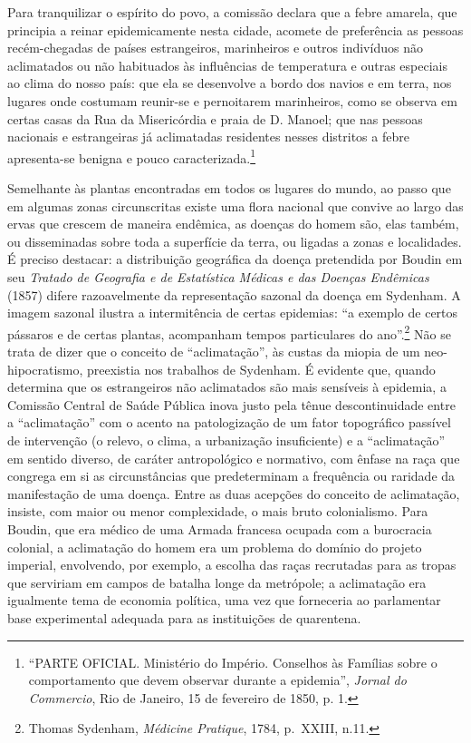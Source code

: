 Para tranquilizar o espírito do povo, a comissão declara que a febre
amarela, que principia a reinar epidemicamente nesta cidade, acomete de
preferência as pessoas recém-chegadas de países estrangeiros,
marinheiros e outros indivíduos não aclimatados ou não habituados às
influências de temperatura e outras especiais ao clima do nosso país:
que ela se desenvolve a bordo dos navios e em terra, nos lugares onde
costumam reunir-se e pernoitarem marinheiros, como se observa em certas
casas da Rua da Misericórdia e praia de D. Manoel; que nas pessoas
nacionais e estrangeiras já aclimatadas residentes nesses distritos a
febre apresenta-se benigna e pouco caracterizada.\footnote{``PARTE
  OFICIAL. Ministério do Império. Conselhos às Famílias sobre o
  comportamento que devem observar durante a epidemia'', \emph{Jornal do
  Commercio}, Rio de Janeiro, 15 de fevereiro de 1850, p. 1.}

Semelhante às plantas encontradas em todos os lugares do mundo, ao passo
que em algumas zonas circunscritas existe uma flora nacional que convive
ao largo das ervas que crescem de maneira endêmica, as doenças do homem
são, elas também, ou disseminadas sobre toda a superfície da terra, ou
ligadas a zonas e localidades. É preciso destacar: a distribuição
geográfica da doença pretendida por Boudin em seu \emph{Tratado de
Geografia e de Estatística Médicas e das Doenças Endêmicas} (1857)
difere razoavelmente da representação sazonal da doença em Sydenham. A
imagem sazonal ilustra a intermitência de certas epidemias: ``a exemplo
de certos pássaros e de certas plantas, acompanham tempos particulares
do ano''.\footnote{Thomas Sydenham, \emph{Médicine Pratique}, 1784,
  p.~XXIII, n.11.} Não se trata de dizer que o conceito de
``aclimatação'', às custas da miopia de um neo-hipocratismo, preexistia
nos trabalhos de Sydenham. É evidente que, quando determina que os
estrangeiros não aclimatados são mais sensíveis à epidemia, a Comissão
Central de Saúde Pública inova justo pela tênue descontinuidade entre a
``aclimatação'' com o acento na patologização de um fator topográfico
passível de intervenção (o relevo, o clima, a urbanização insuficiente)
e a ``aclimatação'' em sentido diverso, de caráter antropológico e
normativo, com ênfase na raça que congrega em si as circunstâncias que
predeterminam a frequência ou raridade da manifestação de uma doença.
Entre as duas acepções do conceito de aclimatação, insiste, com maior ou
menor complexidade, o mais bruto colonialismo. Para Boudin, que era
médico de uma Armada francesa ocupada com a burocracia colonial, a
aclimatação do homem era um problema do domínio do projeto imperial,
envolvendo, por exemplo, a escolha das raças recrutadas para as tropas
que serviriam em campos de batalha longe da metrópole; a aclimatação era
igualmente tema de economia política, uma vez que forneceria ao
parlamentar base experimental adequada para as instituições de
quarentena.

